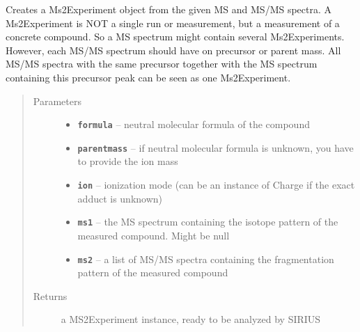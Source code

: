 \documentclass[letterpaper,10pt,openany,oneside]{sphinxmanual}
\begin{document}

\begin{fulllineitems}
\label{library:de.unijena.bioinf.sirius.getMs2Experiment(MolecularFormula, Ionization, Spectrum, Spectrum)}\label{library:de.unijena.bioinf.sirius.getMs2Experiment(double, Ionization, Spectrum, Spectrum)}
Creates a Ms2Experiment object from the given MS and MS/MS spectra. A Ms2Experiment is NOT a single run or measurement, but a measurement of a concrete compound. So a MS spectrum might contain several Ms2Experiments. However, each MS/MS spectrum should have on precursor or parent mass. All MS/MS spectra with the same precursor together with the MS spectrum containing this precursor peak can be seen as one Ms2Experiment.
\begin{quote}\begin{description}
\item[{Parameters}] \leavevmode\begin{itemize}
\item {} 
\textbf{\texttt{formula}} -- neutral molecular formula of the compound

\item {} 
\textbf{\texttt{parentmass}} -- if neutral molecular formula is unknown, you have to provide the ion mass

\item {} 
\textbf{\texttt{ion}} -- ionization mode (can be an instance of Charge if the exact adduct is unknown)

\item {} 
\textbf{\texttt{ms1}} -- the MS spectrum containing the isotope pattern of the measured compound. Might be null

\item {} 
\textbf{\texttt{ms2}} -- a list of MS/MS spectra containing the fragmentation pattern of the measured compound

\end{itemize}

\item[{Returns}] \leavevmode
a MS2Experiment instance, ready to be analyzed by SIRIUS

\end{description}\end{quote}

\end{fulllineitems}
\end{document}

